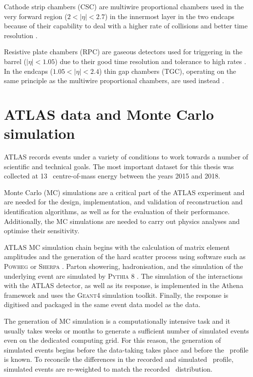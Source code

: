 
Cathode strip chambers (CSC) are multiwire proportional chambers
used in the very forward region ($2 < |\eta| < 2.7$)
in the innermost layer in the two endcaps because of their capability
to deal with a higher rate of collisions and better time resolution
\cite{Aad:2010ag}.

Resistive plate chambers (RPC) are gaseous detectors used for
triggering in the barrel ($|\eta| < 1.05$) due to their good time resolution
and tolerance to high rates \cite{Cattani_2011}. In the endcaps ($1.05 < |\eta| < 2.4$)
thin gap chambers (TGC), operating on the same principle as the multiwire
proportional chambers, are used instead \cite{Nagai:1996mf}.

\section{ATLAS data and Monte Carlo simulation}

ATLAS records events under a variety of conditions to work towards a number of
scientific and technical goals. The most important dataset for this thesis
was collected at 13 \TeV~centre-of-mass energy between the years 2015
and 2018.

Monte Carlo (MC) simulations are a critical part of the ATLAS experiment
and are needed for the design, implementation, and validation of
reconstruction and identification algorithms, as well as for the evaluation
of their performance. Additionally, the MC simulations are needed to
carry out physics analyses and optimise their sensitivity.

ATLAS MC simulation chain begins with the calculation of matrix element 
amplitudes and the generation of the hard scatter process using
software such as \textsc{Powheg} \cite{powheg, Frixione_2007, Alioli_2010}
or \textsc{Sherpa} \cite{sherpa1, sherpa2}. Parton showering, hadronisation,
and the simulation of the underlying event are simulated by
\textsc{Pythia} 8 \cite{Sj_strand_2008}. The simulation of the
interactions with the ATLAS detector, as well as its response, is
implemented in the Athena framework \cite{Aad:2010ah, Duckeck:2005rb} and uses the
\textsc{Geant4} \cite{Agostinelli:2002hh, 1610988, ALLISON2016186}
simulation toolkit. Finally, the response is digitised
and packaged in the same event data model \cite{Buckley_2015} as the
data.

The generation of MC simulation is a computationally intensive task
and it usually takes weeks or months to generate a sufficient number
of simulated events even on the dedicated computing grid. For this
reason, the generation of simulated events begins before the data-taking
takes place and before the \pileup~profile is known. To reconcile the
differences in the recorded and simulated \pileup~profile, simulated
events are re-weighted to match the recorded \pileup~distribution.







